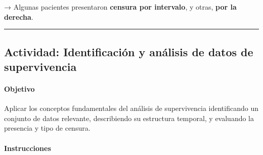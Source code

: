 \documentclass[
  letterpaper,
  DIV=11,
  numbers=noendperiod]{scrartcl}
\begin{document}
→ Algunas pacientes presentaron \textbf{censura por intervalo}, y otras,
\textbf{por la derecha}.

\begin{center}\rule{0.5\linewidth}{0.5pt}\end{center}

\subsection{Actividad: Identificación y análisis de datos de
supervivencia}\label{actividad-identificaciuxf3n-y-anuxe1lisis-de-datos-de-supervivencia}

\paragraph{Objetivo}\label{objetivo}

Aplicar los conceptos fundamentales del análisis de supervivencia
identificando un conjunto de datos relevante, describiendo su estructura
temporal, y evaluando la presencia y tipo de censura.

\paragraph{Instrucciones}\label{instrucciones-1}
\end{document}
